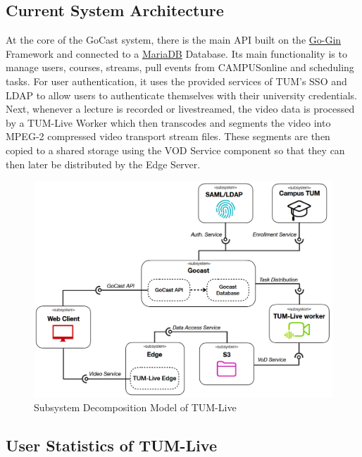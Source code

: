 \subsection{Current System Architecture}

At the core of the GoCast system, there is the main \ac{API} built on the \href{https://github.com/gin-gonic/gin}{Go-Gin} Framework and connected to a \href{https://mariadb.org/}{MariaDB} Database. Its main functionality is to manage users, courses, streams, pull events from CAMPUSonline and scheduling tasks. For user authentication, it uses the provided services of \ac{TUM}'s \ac{SSO} and \ac{LDAP} to allow users to authenticate themselves with their university credentials. 
Next, whenever a lecture is recorded or livestreamed, the video data is processed by a TUM-Live Worker which then transcodes and segments the video into MPEG-2 compressed video transport stream files. These segments are then copied to a shared storage using the VOD Service component so that they can then later be distributed by the Edge Server.

\begin{figure}[htpb]
    \centering
    \includegraphics[width=420pt]{images/OldDeploymentDiagram2.png}
    \caption[Subsystem Decomposition]{Subsystem Decomposition Model of TUM-Live}\label{fig:old-system-architecture}
\end{figure}

\subsection{User Statistics of TUM-Live}\label{subsection:user-stats-tumlive}

